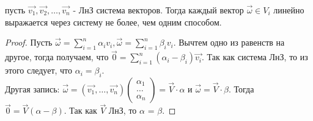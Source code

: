 \begin{proposition}
	пусть \(\vec{v_1}, \vec{v_2}, \ldots, \vec{v_n}\) - ЛнЗ система векторов. Тогда каждый вектор \(\vec{\omega}\in V_i\) линейно выражается через систему не более, чем одним способом.
\end{proposition}
\begin{proof}
	Пусть \(\vec{\omega} = \sum_{i=1}^{n}\alpha_iv_i, \vec{\omega} = \sum_{i=1}^{n}\beta_iv_i\). Вычтем одно из равенств на другое, тогда получаем, что \(\vec{0} = \sum_{i=1}^{n}(\alpha_i-\beta_i)\vec{v_i}\). Так как система ЛнЗ, то из этого следует, что \(\alpha_i = \beta_i\). \\
	Другая запись: $\vec{\omega} = (\vec{v_1}, \ldots, \vec{v_n})\begin{pmatrix}
			\alpha_1 \\ \ldots \\ \alpha_n
		\end{pmatrix} = \vec{V}\cdot\alpha$ и $\vec{\omega} =\vec{V}\cdot\beta$. Тогда $\vec{0} = \vec{V}(\alpha-\beta)$. Так как $\vec{V}$ ЛнЗ, то $\alpha$ = $\beta$.
\end{proof}
